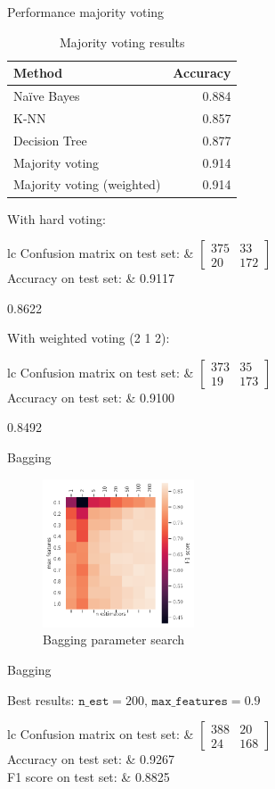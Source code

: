 \documentclass[aspectratio=169]{beamer}
\newcommand{\sresults}[2]{
\begin{table}[H]
\centering
\begin{tabular}{lc}
Confusion matrix on test set: & \( \begin{bmatrix} #1 \end{bmatrix} \) \\
    \addlinespace[0.5em]
    Accuracy on test set: & #2
\end{tabular}
\end{table}
}
\newcommand{\fresults}[3]{
\begin{table}[H]
\centering
\begin{tabular}{lc}
Confusion matrix on test set: & \( \begin{bmatrix} #1 \end{bmatrix} \) \\
    \addlinespace[0.5em]
    Accuracy on test set: & #2 \\
    F1 score on test set: & #3
\end{tabular}
\end{table}
}
\begin{document}
\begin{frame}[allowframebreaks]{Performance majority voting}
\begin{table}[H]
\centering
\caption{Majority voting results}
\begin{tabular}{lr}
\toprule
Method & Accuracy \\
\midrule
Na\"ive Bayes & 0.884 \\
K-NN & 0.857 \\
Decision Tree & 0.877 \\
\addlinespace[0.5em]
Majority voting & 0.914 \\
Majority voting (weighted)  & 0.914 \\
\bottomrule
\end{tabular}
\end{table}

\framebreak

With hard voting:
\sresults{ 375 &  33 \\ 20 & 172 }{ 0.9117 }{ 0.8622 }

\noindent
With weighted voting (2 1 2):
\sresults{ 373 &  35 \\ 19 & 173 }{ 0.9100 }{ 0.8492 }
\end{frame}

\begin{frame}{Bagging}
\begin{figure}[H]
\centering
\includegraphics[width=0.4\textwidth]{bagging}
\caption{Bagging parameter search}%
\label{fig:bagging}
\end{figure}

\end{frame}
\begin{frame}{Bagging}

Best results:  $\texttt{n\_est} = 200,\, \texttt{max\_features} = 0.9$

\fresults{ 388 &  20 \\ 24  & 168 }{0.9267}{0.8825}
\end{frame}
\end{document}
